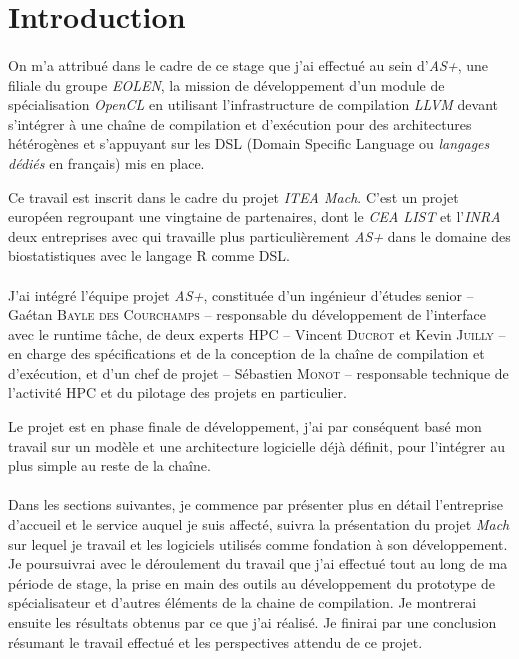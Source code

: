 \section{Introduction}
\paragraph{}
On m'a attribué dans le cadre de ce stage que j'ai effectué au sein
d'\emph{AS+}, une filiale du groupe \emph{EOLEN}, la mission de développement
d'un module de spécialisation \emph{OpenCL} en utilisant l'infrastructure de
compilation \emph{LLVM} devant s'intégrer à une chaîne de compilation et
d’exécution pour des architectures hétérogènes et s’appuyant sur les DSL (Domain
Specific Language ou \emph{langages dédiés} en français) mis en place.

Ce travail est inscrit dans le cadre du projet \emph{ITEA Mach}. C'est un projet
européen regroupant une vingtaine de partenaires, dont le \emph{CEA LIST} et
l'\emph{INRA} deux entreprises avec qui travaille plus particulièrement
\emph{AS+} dans le domaine des biostatistiques avec le langage R comme DSL.

\paragraph{}
J’ai intégré l’équipe projet \emph{AS+}, constituée d’un ingénieur d’études
senior -- Gaétan \textsc{Bayle des Courchamps} -- responsable du développement de
l’interface avec le runtime tâche, de deux experts HPC -- Vincent \textsc{Ducrot}
et Kevin \textsc{Juilly} -- en charge des spécifications et de la conception de
la chaîne de compilation et d’exécution, et d’un chef de projet -- Sébastien
\textsc{Monot} -- responsable technique de l’activité HPC et du pilotage des
projets en particulier.

Le projet est en phase finale de développement, j'ai par conséquent basé mon
travail sur un modèle et une architecture logicielle déjà définit, pour
l'intégrer au plus simple au reste de la chaîne.

\paragraph{}
Dans les sections suivantes, je commence par présenter plus en détail
l'entreprise d'accueil et le service auquel je suis affecté, suivra la
présentation du projet \emph{Mach} sur lequel je travail et les logiciels
utilisés comme fondation à son développement. Je poursuivrai avec le déroulement
du travail que j'ai effectué tout au long de ma période de stage, la prise en
main des outils au développement du prototype de spécialisateur et d’autres
éléments de la chaine de compilation. Je montrerai ensuite les résultats obtenus
par ce que j’ai réalisé. Je finirai par une conclusion résumant le travail
effectué et les perspectives attendu de ce projet.
